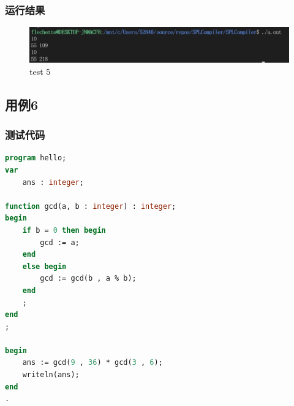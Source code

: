\documentclass{article}
\begin{document}
\subsubsection{运行结果}
\begin{figure}[H]
    \centering
    \includegraphics[width=1\textwidth]{test5res.png}
    \caption{test 5}
\end{figure}

\subsection{用例6}
\subsubsection{测试代码}
\begin{lstlisting}[language=pascal,showstringspaces=false]
program hello;
var 
	ans : integer;

function gcd(a, b : integer) : integer;
begin
	if b = 0 then begin
		gcd := a;
	end
	else begin
		gcd := gcd(b , a % b);
	end
	;
end
;

begin
	ans := gcd(9 , 36) * gcd(3 , 6);
	writeln(ans);
end
.
\end{lstlisting}
\end{document}
